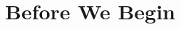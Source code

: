 \documentclass[../main]{subfiles}
\begin{document}
\chapter{Before We Begin} \label{chp:}






\end{document}
